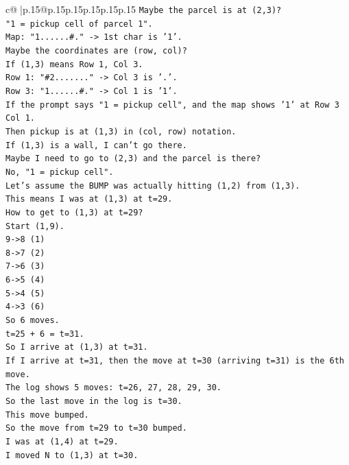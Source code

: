 \documentclass{article}
\begin{document}
{\begin{supertabular}{c@{$\;$}|p{.15\linewidth}@{}p{.15\linewidth}p{.15\linewidth}p{.15\linewidth}p{.15\linewidth}p{.15\linewidth}}
{{{\texttt{Maybe the parcel is at (2,3)?} \\
\texttt{"1 = pickup cell of parcel 1".} \\
\texttt{Map: "1......\#." {-}> 1st char is '1'.} \\
\texttt{Maybe the coordinates are (row, col)?} \\
\texttt{If (1,3) means Row 1, Col 3.} \\
\texttt{Row 1: "\#2......." {-}> Col 3 is '.'.} \\
\texttt{Row 3: "1......\#." {-}> Col 1 is '1'.} \\
\texttt{If the prompt says "1 = pickup cell", and the map shows '1' at Row 3 Col 1.} \\
\texttt{Then pickup is at (1,3) in (col, row) notation.} \\
\texttt{If (1,3) is a wall, I can't go there.} \\
\texttt{Maybe I need to go to (2,3) and the parcel is there?} \\
\texttt{No, "1 = pickup cell".} \\
\texttt{Let's assume the BUMP was actually hitting (1,2) from (1,3).} \\
\texttt{This means I was at (1,3) at t=29.} \\
\texttt{How to get to (1,3) at t=29?} \\
\texttt{Start (1,9).} \\
\texttt{9{-}>8 (1)} \\
\texttt{8{-}>7 (2)} \\
\texttt{7{-}>6 (3)} \\
\texttt{6{-}>5 (4)} \\
\texttt{5{-}>4 (5)} \\
\texttt{4{-}>3 (6)} \\
\texttt{So 6 moves.} \\
\texttt{t=25 + 6 = t=31.} \\
\texttt{So I arrive at (1,3) at t=31.} \\
\texttt{If I arrive at t=31, then the move at t=30 (arriving t=31) is the 6th move.} \\
\texttt{The log shows 5 moves: t=26, 27, 28, 29, 30.} \\
\texttt{So the last move in the log is t=30.} \\
\texttt{This move bumped.} \\
\texttt{So the move from t=29 to t=30 bumped.} \\
\texttt{I was at (1,4) at t=29.} \\
\texttt{I moved N to (1,3) at t=30.} \\
}}}
\end{supertabular}}
\end{document}
